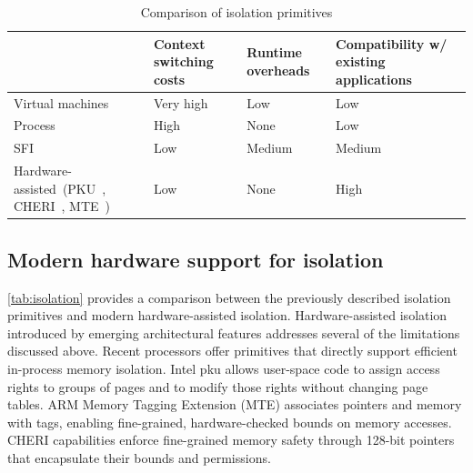 \begin{table}[t]
	\small
	\begin{center}
		\begin{tabular}[c]{p{6cm}p{2cm}p{2cm}p{3cm}}
			\toprule
			                                                                & Context switching costs & Runtime overheads & Compatibility w/ existing applications \\
			\midrule
			Virtual machines                                                & Very high               & Low               & Low                                                   \\
			Process                                                         & High                    & None              & Low                                                   \\
			SFI                                                             & Low                     & Medium            & Medium                                                \\
			Hardware-assisted\
			(PKU~\cite{park2019libmpk}, CHERI~\cite{cheri}, MTE~\cite{mte}) & Low                     & None              & High                                                  \\
			\bottomrule
		\end{tabular}
		\caption{Comparison of isolation primitives}\label{tab:isolation}
	\end{center}
\end{table}


\subsection{Modern hardware support for isolation}



\autoref{tab:isolation} provides a comparison between the previously described isolation primitives and modern hardware-assisted isolation.
Hardware-assisted isolation introduced by emerging architectural features addresses several of the limitations discussed above.
Recent processors offer primitives that directly support efficient in-process memory isolation.
Intel \gls{pku} allows user-space code to assign access rights to groups of pages and to modify those rights without changing page tables.
ARM Memory Tagging Extension (MTE) associates pointers and memory with tags, enabling fine-grained, hardware-checked bounds on memory accesses.
CHERI capabilities enforce fine-grained memory safety through 128-bit pointers that encapsulate their bounds and permissions.


